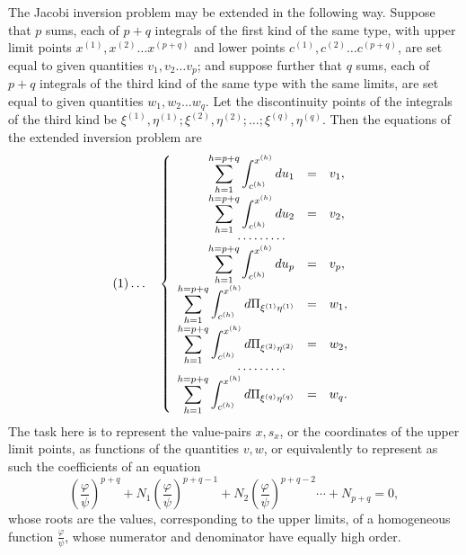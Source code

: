 \documentclass[10pt]{article}
\begin{document}
The Jacobi inversion problem may be extended in the following way. Suppose that \(p\) sums, each of \(p+q\) integrals of the first kind of the same type, with upper limit points \(x^{(1)},x^{(2)}\ldots x^{(p+q)}\) and lower points \(c^{(1)},c^{(2)}\ldots c^{(p+q)}\), are set equal to given quantities \(v_1,v_2\ldots v_p\); and suppose further that \(q\) sums, each of \(p+q\) integrals of the third kind of the same type with the same limits, are set equal to given quantities \(w_1,w_2\ldots w_q\). Let the discontinuity points of the integrals of the third kind be \(\xi^{(1)},\eta^{(1)};\xi^{(2)},\eta^{(2)};\ldots;\xi^{(q)},\eta^{(q)}\). Then the equations of the extended inversion problem are
\[
(1)\ldots\quad
\left\{\begin{array}{rcl}
\displaystyle\sum_{h=1}^{h=p+q}\int_{c^{(h)}}^{x^{(h)}}du_1&=&v_1,\\
\displaystyle\sum_{h=1}^{h=p+q}\int_{c^{(h)}}^{x^{(h)}}du_2&=&v_2,\\[-0.2em]
\multicolumn{3}{c}{\cdots\cdots\cdots}\\[-0.2em]
\displaystyle\sum_{h=1}^{h=p+q}\int_{c^{(h)}}^{x^{(h)}}du_p&=&v_p,\\
\displaystyle\sum_{h=1}^{h=p+q}\int_{c^{(h)}}^{x^{(h)}}d\Pi_{\xi^{(1)}\eta^{(1)}}&=&w_1,\\
\displaystyle\sum_{h=1}^{h=p+q}\int_{c^{(h)}}^{x^{(h)}}d\Pi_{\xi^{(2)}\eta^{(2)}}&=&w_2,\\[-0.2em]
\multicolumn{3}{c}{\cdots\cdots\cdots}\\[-0.2em]
\displaystyle\sum_{h=1}^{h=p+q}\int_{c^{(h)}}^{x^{(h)}}d\Pi_{\xi^{(q)}\eta^{(q)}}&=&w_q.
\end{array}\right.
\]
The task here is to represent the value-pairs \(x,s_x\), or the coordinates of the upper limit points, as functions of the quantities \(v,w\), or equivalently to represent as such the coefficients of an equation
\[
\left(\frac{\varphi}{\psi}\right)^{p+q}+N_1\left(\frac{\varphi}{\psi}\right)^{p+q-1}+N_2\left(\frac{\varphi}{\psi}\right)^{p+q-2}\cdots+N_{p+q}=0,
\]
whose roots are the values, corresponding to the upper limits, of a homogeneous function \(\frac{\varphi}{\psi}\), whose numerator and denominator have equally high order.
\end{document}
